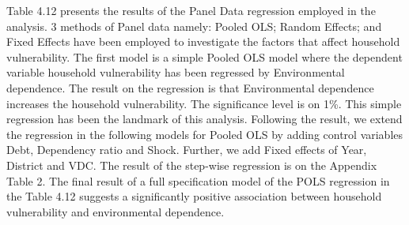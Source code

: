 \documentclass[12pt, a4paper]{article}
\begin{document}
Table 4.12 presents the results of the Panel Data regression employed in the analysis. 3 methods of Panel data namely: Pooled OLS; Random Effects; and Fixed Effects have been employed to investigate the factors that affect household vulnerability. The first model is a simple Pooled OLS model where the dependent variable household vulnerability has been regressed by Environmental dependence. The result on the regression is that Environmental dependence increases the household vulnerability. The significance level is on 1\%. This simple regression has been the landmark of this analysis. Following the result, we extend the regression in the following models for Pooled OLS by adding control variables Debt, Dependency ratio and Shock. Further, we add Fixed effects of Year, District and VDC. The result of the step-wise regression is on the Appendix Table 2. The final result of a full specification model of the POLS regression in the Table 4.12 suggests a significantly positive association between household vulnerability and environmental dependence.
\end{document}
